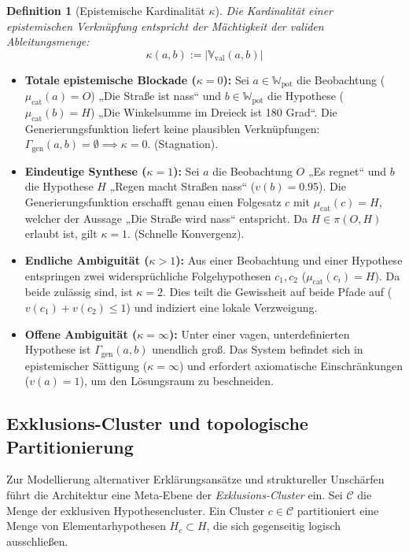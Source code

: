 \documentclass[11pt, a4paper]{article}
\newtheorem{definition}{Definition}
\begin{document}
	\begin{definition}[Epistemische Kardinalität $\kappa$]
		Die Kardinalität einer epistemischen Verknüpfung entspricht der Mächtigkeit der validen Ableitungsmenge:
		\[
		\kappa(a, b) := |\mathbb{V}_{\text{val}}(a, b)|
		\]
	\end{definition}
	
	\begin{itemize}
		\item \textbf{Totale epistemische Blockade ($\kappa = 0$):}  
		Sei $a \in \mathbb{W}_{\text{pot}}$ die Beobachtung ($\mu_{\text{cat}}(a) = O$) „Die Straße ist nass“ und $b \in \mathbb{W}_{\text{pot}}$ die Hypothese ($\mu_{\text{cat}}(b) = H$) „Die Winkelsumme im Dreieck ist 180 Grad“. Die Generierungsfunktion liefert keine plausiblen Verknüpfungen: $\Gamma_{\text{gen}}(a,b) = \emptyset \implies \kappa = 0$. (Stagnation).
		
		\item \textbf{Eindeutige Synthese ($\kappa = 1$):}  
		Sei $a$ die Beobachtung $O$ „Es regnet“ und $b$ die Hypothese $H$ „Regen macht Straßen nass“ ($v(b)=0.95$). Die Generierungsfunktion erschafft genau einen Folgesatz $c$ mit $\mu_{\text{cat}}(c) = H$, welcher der Aussage „Die Straße wird nass“ entspricht. Da $H \in \pi(O, H)$ erlaubt ist, gilt $\kappa = 1$. (Schnelle Konvergenz).
		
		\item \textbf{Endliche Ambiguität ($\kappa > 1$):}  
		Aus einer Beobachtung und einer Hypothese entspringen zwei widersprüchliche Folgehypothesen $c_1, c_2$ ($\mu_{\text{cat}}(c_i) = H$). Da beide zulässig sind, ist $\kappa = 2$. Dies teilt die Gewissheit auf beide Pfade auf ($v(c_1) + v(c_2) \le 1$) und indiziert eine lokale Verzweigung.
		
		\item \textbf{Offene Ambiguität ($\kappa = \infty$):}  
		Unter einer vagen, unterdefinierten Hypothese ist $\Gamma_{\text{gen}}(a,b)$ unendlich groß. Das System befindet sich in epistemischer Sättigung ($\kappa = \infty$) und erfordert axiomatische Einschränkungen ($v(a)=1$), um den Lösungsraum zu beschneiden.
	\end{itemize}
	
	\subsection{Exklusions-Cluster und topologische Partitionierung}
	
	Zur Modellierung alternativer Erklärungsansätze und struktureller Unschärfen führt die Architektur eine Meta-Ebene der \emph{Exklusions-Cluster} ein. Sei $\mathcal{C}$ die Menge der exklusiven Hypothesencluster. Ein Cluster $c \in \mathcal{C}$ partitioniert eine Menge von Elementarhypothesen $H_c \subset H$, die sich gegenseitig logisch ausschließen. 
	
\end{document}
